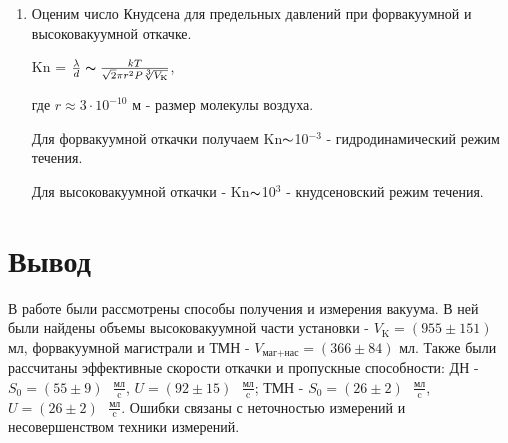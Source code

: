 \documentclass[a4paper,12pt]{article} %
\begin{document}
\begin{enumerate}
\item Оценим число Кнудсена для предельных давлений при форвакуумной и высоковакуумной откачке.

Kn = $\frac{\lambda}{d} \thicksim \frac{kT}{\sqrt{2}\pi r^2 P \sqrt[3]{V_{\text{K}}}}$,

где $r \approx 3\cdot 10^{-10}$ м - размер молекулы воздуха.

Для форвакуумной откачки получаем Kn$\thicksim$10$^{-3}$ - гидродинамический режим течения.

Для высоковакуумной откачки - Kn$\thicksim$10$^3$ - кнудсеновский режим течения.

\end{enumerate}

\newpage
\section*{Вывод}
В работе были рассмотрены способы получения и измерения вакуума. В ней были найдены объемы высоковакуумной части установки - $V_{\text{K}} = (955 \pm 151)$ мл, форвакуумной магистрали и ТМН - $V_{\text{маг+нас}} = (366 \pm 84)$ мл. Также были рассчитаны эффективные скорости откачки и пропускные способности: ДН  - $S_{0} = (55 \pm 9) \text{ }\frac{\text{мл}}{\text{c}}$, $U = (92 \pm 15)\text{ }\frac{\text{мл}}{\text{c}}$; ТМН -  $S_{0} = (26 \pm 2)\text{ }\frac{\text{мл}}{\text{c}}$, $U = (26 \pm 2)\text{ }\frac{\text{мл}}{\text{c}}$. Ошибки связаны с неточностью измерений и несовершенством техники измерений.
\end{document}
